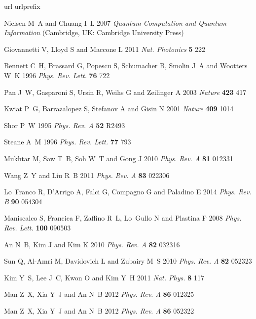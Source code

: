 \documentclass[12pt]{iopart}
\begin{document}
\begin{thebibliography}{10}
\expandafter\ifx\csname url\endcsname\relax
  \def\url#1{{\tt #1}}\fi
\expandafter\ifx\csname urlprefix\endcsname\relax\def\urlprefix{URL }\fi
\providecommand{\eprint}[2][]{\url{#2}}

Nielsen M~A and Chuang I~L 2007 {\em Quantum Computation and Quantum
  Information\/} (Cambridge, UK: Cambridge University Press)

Giovannetti V, Lloyd S and Maccone L 2011 {\em Nat. Photonics\/} {\bf 5} 222

Bennett C~H, Brassard G, Popescu S, Schumacher B, Smolin J~A and Wootters W~K
  1996 {\em Phys. Rev. Lett.\/} {\bf 76} 722

Pan J~W, Gasparoni S, Ursin R, Weihs G and Zeilinger A 2003 {\em Nature\/} {\bf
  423} 417

Kwiat P~G, Barrazalopez S, Stefanov A and Gisin N 2001 {\em Nature\/} {\bf 409}
  1014

Shor P~W 1995 {\em Phys. Rev. A\/} {\bf 52} R2493

Steane A~M 1996 {\em Phys. Rev. Lett.\/} {\bf 77} 793

Mukhtar M, Saw T~B, Soh W~T and Gong J 2010 {\em Phys. Rev. A\/} {\bf 81}
  012331

Wang Z~Y and Liu R~B 2011 {\em Phys. Rev. A\/} {\bf 83} 022306

Lo~Franco R, D'Arrigo A, Falci G, Compagno G and Paladino E 2014 {\em Phys.
  Rev. B\/} {\bf 90} 054304

Maniscalco S, Francica F, Zaffino R~L, Lo~Gullo N and Plastina F 2008 {\em
  Phys. Rev. Lett.\/} {\bf 100} 090503

An N~B, Kim J and Kim K 2010 {\em Phys. Rev. A\/} {\bf 82} 032316

Sun Q, Al-Amri M, Davidovich L and Zubairy M~S 2010 {\em Phys. Rev. A\/} {\bf
  82} 052323

Kim Y~S, Lee J~C, Kwon O and Kim Y~H 2011 {\em Nat. Phys.\/} {\bf 8} 117

Man Z~X, Xia Y~J and An N~B 2012 {\em Phys. Rev. A\/} {\bf 86} 012325

Man Z~X, Xia Y~J and An N~B 2012 {\em Phys. Rev. A\/} {\bf 86} 052322


\end{thebibliography}
\end{document}

